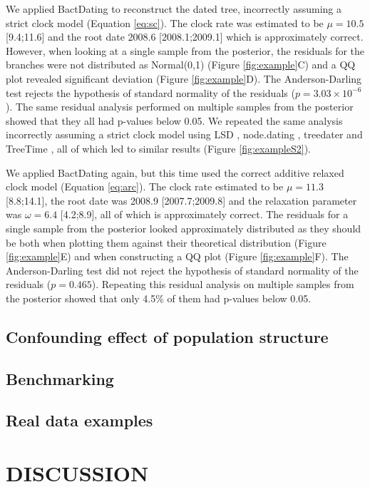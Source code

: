 \documentclass{article}
\begin{document}
We applied BactDating \citep{Didelot2018} to reconstruct the dated tree, 
incorrectly assuming a strict clock model (Equation \ref{eq:sc}).
The clock rate was estimated to be $\mu=10.5$ [9.4;11.6] and the root date 
2008.6 [2008.1;2009.1] which is approximately correct.
However, when looking at a single sample from the posterior,
the residuals for the branches were not distributed as Normal(0,1) (Figure \ref{fig:example}C)
and a QQ plot revealed significant deviation (Figure \ref{fig:example}D). 
The Anderson-Darling test rejects the hypothesis of standard normality of the residuals ($p=3.03\times10^{-6}$).
The same residual analysis performed on multiple samples from the posterior showed that they all
had p-values below 0.05.
We repeated the same analysis incorrectly assuming a strict clock model using 
LSD \citep{To2016}, node.dating \citep{Jones2017}, treedater \citep{Volz2017} and TreeTime \citep{Sagulenko2018},
all of which led to similar results (Figure \ref{fig:exampleS2}). 

We applied BactDating again, but this time used the correct additive relaxed clock model (Equation \ref{eq:arc}). 
The clock rate estimated to be $\mu=11.3$ [8.8;14.1], the root date was 2008.9 [2007.7;2009.8]
and the relaxation parameter was $\omega=6.4$ [4.2;8.9], all of which is approximately correct.
The residuals for a single sample from the posterior 
looked approximately distributed as they should be both when plotting them against
their theoretical distribution (Figure \ref{fig:example}E) and when constructing a QQ plot (Figure \ref{fig:example}F).
The Anderson-Darling test did not reject the hypothesis of standard normality of the residuals ($p=0.465$).
Repeating this residual analysis on multiple samples from the posterior showed that only 4.5\% of 
them had p-values below 0.05.

\subsection*{Confounding effect of population structure}

\subsection*{Benchmarking}

\subsection*{Real data examples}

\section*{DISCUSSION}
\end{document}

